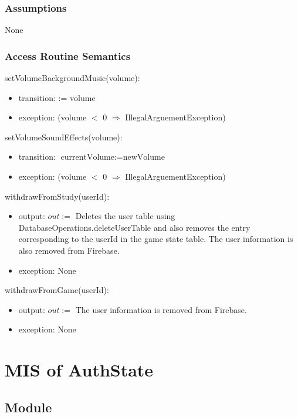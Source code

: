 \documentclass[12pt, titlepage]{article}
\begin{document}
\subsubsection{Assumptions}
None

\subsubsection{Access Routine Semantics}

\noindent setVolumeBackgroundMusic(volume):
\begin{itemize}
\item transition:  := volume
\item exception: (volume $<$ 0 $\Rightarrow$ IllegalArguementException)
\end{itemize}

\noindent setVolumeSoundEffects(volume):
\begin{itemize}
\item transition: $\text{currentVolume} := \text{newVolume}$ 
\item exception: (volume $<$ 0 $\Rightarrow$ IllegalArguementException)
\end{itemize}

\noindent withdrawFromStudy(userId):
\begin{itemize}
\item output: $out := $ Deletes the user table using DatabaseOperations.deleteUserTable and also removes the entry corresponding to the userId in the game state table. The user information is also removed from Firebase.
\item exception: None
\end{itemize}

\noindent withdrawFromGame(userId):
\begin{itemize}
\item output: $out := $ The user information is removed from Firebase.
\item exception: None
\end{itemize}

\medskip
\newpage
\section{MIS of AuthState} \label{AuthState} 

\subsection{Module}
\end{document}
